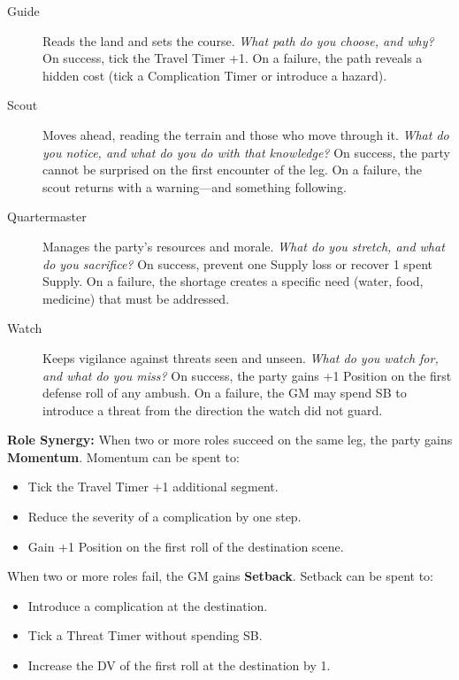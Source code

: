 \begin{description}
\item[Guide]  Reads the land and sets the course. \textit{What path do you choose, and why?} On success, tick the Travel Timer +1. On a failure, the path reveals a hidden cost (tick a Complication Timer or introduce a hazard).
\item[Scout]  Moves ahead, reading the terrain and those who move through it. \textit{What do you notice, and what do you do with that knowledge?} On success, the party cannot be surprised on the first encounter of the leg. On a failure, the scout returns with a warning—and something following.
\item[Quartermaster]  Manages the party's resources and morale. \textit{What do you stretch, and what do you sacrifice?} On success, prevent one Supply loss or recover 1 spent Supply. On a failure, the shortage creates a specific need (water, food, medicine) that must be addressed.
\item[Watch]  Keeps vigilance against threats seen and unseen. \textit{What do you watch for, and what do you miss?} On success, the party gains +1 Position on the first defense roll of any ambush. On a failure, the GM may spend SB to introduce a threat from the direction the watch did not guard.
\end{description}

\textbf{Role Synergy:} When two or more roles succeed on the same leg, the party gains \textbf{Momentum}. Momentum can be spent to:
\begin{itemize}
\item Tick the Travel Timer +1 additional segment.
\item Reduce the severity of a complication by one step.
\item Gain +1 Position on the first roll of the destination scene.
\end{itemize}

When two or more roles fail, the GM gains \textbf{Setback}. Setback can be spent to:
\begin{itemize}
\item Introduce a complication at the destination.
\item Tick a Threat Timer without spending SB.
\item Increase the DV of the first roll at the destination by 1.
\end{itemize}

